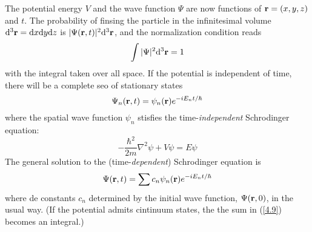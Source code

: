 The potential energy $V$ and the wave function $\Psi$ are now functions of $\vb{r}=(x,y,z)$ and $t$. The probability of finsing the particle in the infinitesimal volume $\dd ^3\vb{r}=\dd x\dd y\dd z$ is $|\Psi(\vb{r},t)|^2\dd^3\vb{r}$,  and the normalization condition reads
\begin{equation}\label{4.6}
	\int |\Psi|^2\dd ^3\vb{r}=1
\end{equation}
with the integral taken over all space. If the potential is independent of time, there will be a complete seo of stationary states
\begin{equation}\label{4.7}
	\Psi_n(\vb{r},t)=\psi_n(\vb{r})e^{-iE_nt/\hbar}
\end{equation}
where the spatial wave function $\psi_n$ stisfies the time-\textit{independent} Schrodinger equation:
\begin{equation}\label{4.8}
	\boxed{-\frac{\hbar^2}{2m}\nabla^2\psi+V\psi=E\psi}
\end{equation}
The general solution to the (time-\textit{dependent}) Schrodinger equation is
\begin{equation}\label{4.9}
	\Psi(\vb{r},t)=\sum c_n\psi_n(\vb{r})e^{-iE_nt/\hbar}
\end{equation}
where de constants $c_n$ determined by the initial wave function, $\Psi(\vb{r},0)$, in the usual way. (If the potential admits cintinuum states, the the sum in (\ref{4.9}) becomes an integral.)


